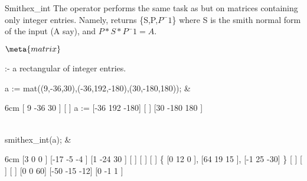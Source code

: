 \begin{Operator}{Smithex\_int}
The operator  performs the same task as 
but on matrices containing only integer entries. Namely, 
 returns \{S,P,$P^-1$\} where S is the smith normal
form of the input  (A say), and $P*S*P^-1 = A$.

\begin{Syntax}
\(\meta{matrix}\)

 :- a rectangular  of integer entries.
\end{Syntax}

\begin{Examples}
 a := mat((9,-36,30),(-36,192,-180),(30,-180,180)); &
\begin{multilineoutput}{6cm}
     [ 9   -36    30 ]
     [               ]
a := [-36  192   -180]
     [               ]
     [30   -180  180 ]
\end{multilineoutput}\\

 smithex_int(a); &
\begin{multilineoutput}{6cm}
  [3  0   0 ]    [-17  -5   -4 ]    [1   -24  30 ]
  [         ]    [             ]    [            ]
\{ [0  12  0 ],   [64   19   15 ],   [-1  25   -30] \}
  [         ]    [             ]    [            ] 
  [0  0   60]    [-50  -15  -12]    [0   -1    1 ] 
\end{multilineoutput}\\
\end{Examples}
\end{Operator}


